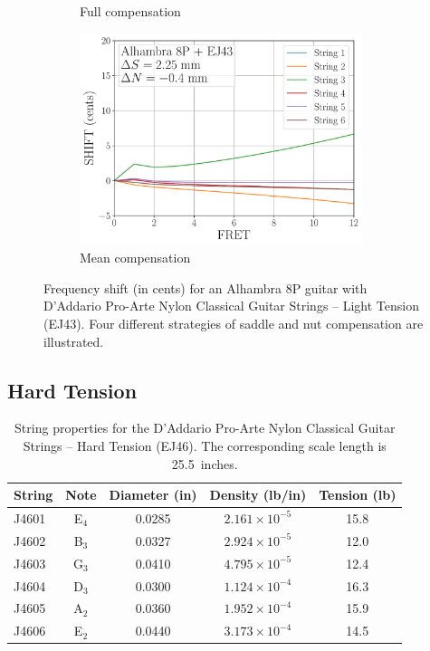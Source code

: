 \begin{figure}
\begin{subfigure}[b]{0.45\textwidth}
   \caption{Full compensation}
   \label{fig:shift_alhambra8p_ej43_full}
  \end{subfigure}
  \hspace{0.25in}
  \begin{subfigure}[b]{0.45\textwidth}
   \centering
   \includegraphics[width=3.25in]{figures/shift_alhambra8p_ej43_mean}
   \caption{Mean compensation}
   \label{fig:shift_alhambra8p_ej43_mean}
  \end{subfigure}
  \caption{\label{fig:compensation_alhambra8p_ej43} Frequency shift (in cents) for an Alhambra 8P guitar with D'Addario Pro-Arte Nylon Classical Guitar Strings -- Light Tension (EJ43). Four different strategies of saddle and nut compensation are illustrated.}
 \end{figure}

 \newpage
 \subsection{Hard Tension}

 \begin{table}[htbp]
  \centering
  \caption{\label{tbl:ej46_ips} String properties for the D'Addario Pro-Arte Nylon Classical Guitar Strings -- Hard Tension (EJ46). The corresponding scale length is 25.5~inches.}
    \begin{tabular}{lcccc}
    \hline \hline
    String  & Note  & \multicolumn{1}{l}{Diameter (in)} & \multicolumn{1}{l}{Density (lb/in)} & \multicolumn{1}{l}{Tension (lb)} \\
    \hline
    J4601 & E$_4$  & 0.0285 & $2.161 \times 10^{-5}$ & 15.8 \\
    J4602 & B$_3$  & 0.0327 & $2.924 \times 10^{-5}$ & 12.0 \\
    J4603 & G$_3$  & 0.0410 & $4.795 \times 10^{-5}$ & 12.4 \\
    J4604 & D$_3$  & 0.0300 & $1.124 \times 10^{-4}$ & 16.3 \\
    J4605 & A$_2$  & 0.0360 & $1.952 \times 10^{-4}$ & 15.9 \\
    J4606 & E$_2$  & 0.0440 & $3.173 \times 10^{-4}$ & 14.5 \\
    \hline
    \end{tabular}%
 \end{table}%

